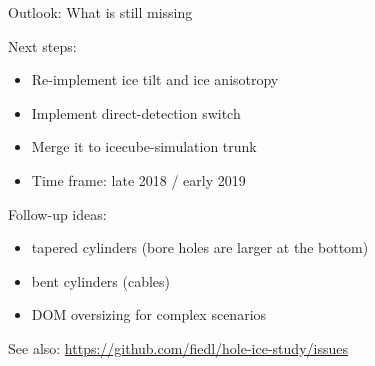 
\begin{frame}{Outlook: What is still missing}

  Next steps:

  \begin{itemize}
    \item Re-implement ice tilt and ice anisotropy
    \item Implement direct-detection switch
    \item Merge it to icecube-simulation trunk
    \item Time frame: late 2018 / early 2019
  \end{itemize}

  \bigskip

  Follow-up ideas:
  \begin{itemize}
    \item tapered cylinders (bore holes are larger at the bottom)
    \item bent cylinders (cables)
    \item DOM oversizing for complex scenarios
  \end{itemize}


  \bigskip

  See also: \url{https://github.com/fiedl/hole-ice-study/issues}
\end{frame}

